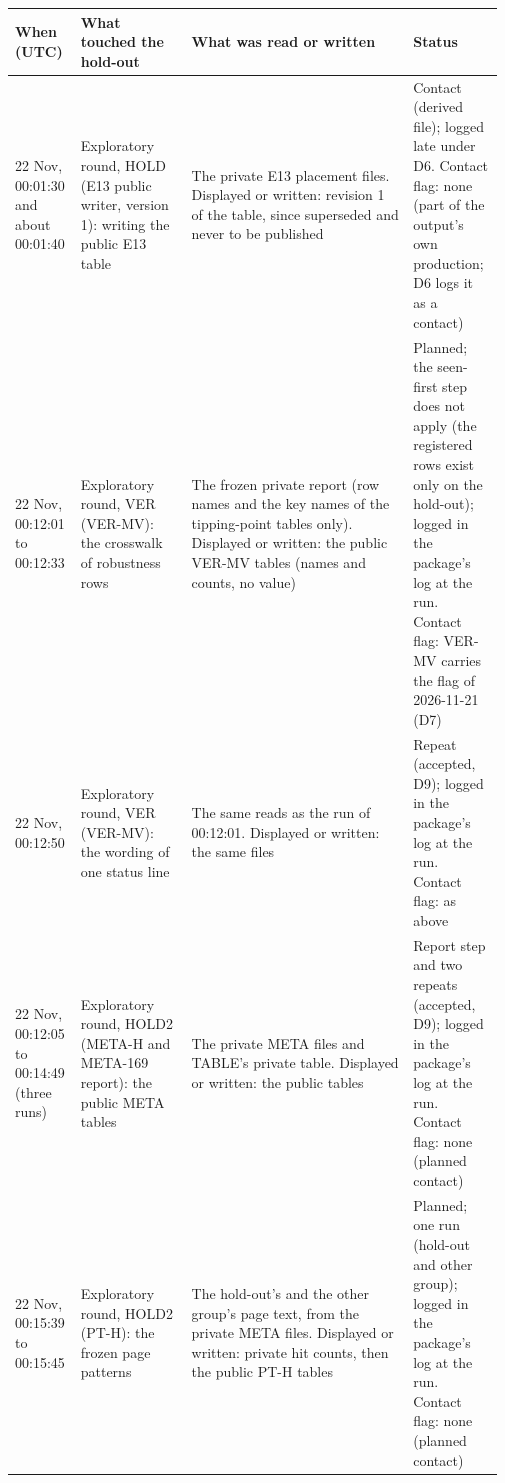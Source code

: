 {\scriptsize\setlength{\tabcolsep}{2pt}
\begin{tabular}{@{}p{0.13\linewidth}p{0.22\linewidth}p{0.44\linewidth}p{0.18\linewidth}@{}}
\toprule
When (UTC) & What touched the hold-out & What was read or written & Status \\
\midrule
22 Nov, 00:01:30 and about 00:01:40 & Exploratory round, HOLD (E13 public writer, version 1): writing the public E13 table & The private E13 placement files. Displayed or written: revision 1 of the table, since superseded and never to be published & Contact (derived file); logged late under D6. Contact flag: none (part of the output's own production; D6 logs it as a contact) \\
22 Nov, 00:12:01 to 00:12:33 & Exploratory round, VER (VER-MV): the crosswalk of robustness rows & The frozen private report (row names and the key names of the tipping-point tables only). Displayed or written: the public VER-MV tables (names and counts, no value) & Planned; the seen-first step does not apply (the registered rows exist only on the hold-out); logged in the package's log at the run. Contact flag: VER-MV carries the flag of 2026-11-21 (D7) \\
22 Nov, 00:12:50 & Exploratory round, VER (VER-MV): the wording of one status line & The same reads as the run of 00:12:01. Displayed or written: the same files & Repeat (accepted, D9); logged in the package's log at the run. Contact flag: as above \\
22 Nov, 00:12:05 to 00:14:49 (three runs) & Exploratory round, HOLD2 (META-H and META-169 report): the public META tables & The private META files and TABLE's private table. Displayed or written: the public tables & Report step and two repeats (accepted, D9); logged in the package's log at the run. Contact flag: none (planned contact) \\
22 Nov, 00:15:39 to 00:15:45 & Exploratory round, HOLD2 (PT-H): the frozen page patterns & The hold-out's and the other group's page text, from the private META files. Displayed or written: private hit counts, then the public PT-H tables & Planned; one run (hold-out and other group); logged in the package's log at the run. Contact flag: none (planned contact) \\

\end{tabular}}
